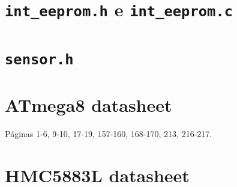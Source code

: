 \documentclass[brazil,pagestart=firstchapter]{abnt}
\begin{document}
\chapter{\texttt{int\_eeprom.h} e \texttt{int\_eeprom.c}}
\label{ape:int_eeprom}




\chapter{\texttt{sensor.h}}
\label{ape:sensor}

%

%
%
%
%
%
%
%
%
%
%


\anexo


\chapter{ATmega8 datasheet}
\label{anx:atmega8_datasheet}

Páginas            1-6, 9-10, 17-19, 157-160, 168-170, 213, 216-217. \cite{ATmega8}




\chapter{HMC5883L datasheet}
\label{anx:hmc5883l_datasheet}
\end{document}
